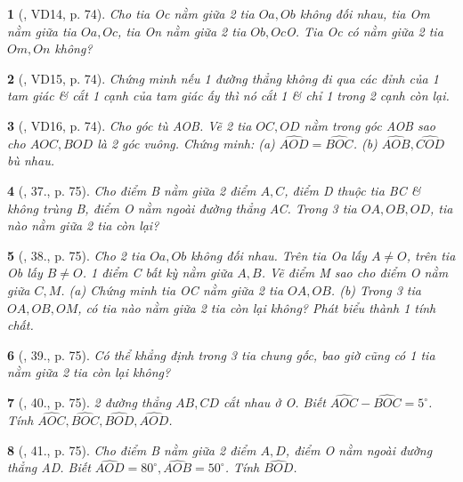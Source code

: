 \documentclass{article}
\newtheorem{baitoan}{}
\begin{document}
\begin{baitoan}[\cite{Binh_Toan_6_tap_2}, VD14, p. 74]
	Cho tia Oc nằm giữa 2 tia $Oa,Ob$ không đối nhau, tia Om nằm giữa tia $Oa,Oc$, tia On nằm giữa 2 tia $Ob,Oc$O. Tia Oc có nằm giữa 2 tia $Om,On$ không?
\end{baitoan}

\begin{baitoan}[\cite{Binh_Toan_6_tap_2}, VD15, p. 74]
	Chứng minh nếu 1 đường thẳng không đi qua các đỉnh của 1 tam giác \& cắt 1 cạnh của tam giác ấy thì nó cắt 1 \& chỉ 1 trong 2 cạnh còn lại.
\end{baitoan}

\begin{baitoan}[\cite{Binh_Toan_6_tap_2}, VD16, p. 74]
	Cho góc tù AOB. Vẽ 2 tia $OC,OD$ nằm trong góc AOB sao cho $AOC,BOD$ là 2 góc vuông. Chứng minh: (a) $\widehat{AOD} = \widehat{BOC}$. (b) $\widehat{AOB},\widehat{COD}$ bù nhau.
\end{baitoan}

\begin{baitoan}[\cite{Binh_Toan_6_tap_2}, 37., p. 75]
	Cho điểm B nằm giữa 2 điểm $A,C$, điểm D thuộc tia BC \& không trùng B, điểm O nằm ngoài đường thẳng AC. Trong 3 tia $OA,OB,OD$, tia nào nằm giữa 2 tia còn lại?
\end{baitoan}

\begin{baitoan}[\cite{Binh_Toan_6_tap_2}, 38., p. 75]
	Cho 2 tia $Oa,Ob$ không đối nhau. Trên tia Oa lấy $A\ne O$, trên tia Ob lấy $B\ne O$. 1 điểm C bất kỳ nằm giữa $A,B$. Vẽ điểm M sao cho điểm O nằm giữa $C,M$. (a) Chứng minh tia OC nằm giữa 2 tia $OA,OB$. (b) Trong 3 tia $OA,OB,OM$, có tia nào nằm giữa 2 tia còn lại không? Phát biểu thành 1 tính chất.
\end{baitoan}

\begin{baitoan}[\cite{Binh_Toan_6_tap_2}, 39., p. 75]
	Có thể khẳng định trong 3 tia chung gốc, bao giờ cũng có 1 tia nằm giữa 2 tia còn lại không?
\end{baitoan}

\begin{baitoan}[\cite{Binh_Toan_6_tap_2}, 40., p. 75]
	2 đường thẳng $AB,CD$ cắt nhau ở O. Biết $ \widehat{AOC} - \widehat{BOC} = 5^\circ$. Tính $\widehat{AOC},\widehat{BOC},\widehat{BOD},\widehat{AOD}$.
\end{baitoan}

\begin{baitoan}[\cite{Binh_Toan_6_tap_2}, 41., p. 75]
	Cho điểm B nằm giữa 2 điểm $A,D$, điểm O nằm ngoài đường thẳng AD. Biết $\widehat{AOD} = 80^\circ,\widehat{AOB} = 50^\circ$. Tính $\widehat{BOD}$.
\end{baitoan}
\end{document}
